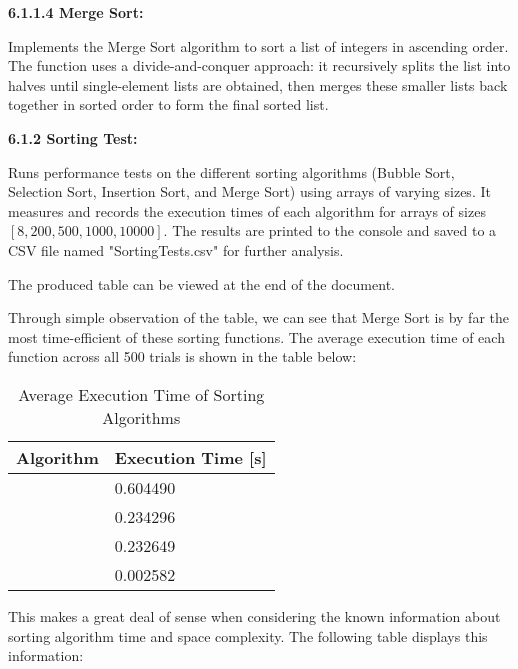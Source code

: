 \begin{homeworkProblem}

	{\Large\textbf{6.1.1.4 Merge Sort:}}

	Implements the Merge Sort algorithm to sort a list of integers in ascending order. The function uses a divide-and-conquer approach: it recursively splits the list into halves until single-element lists are obtained, then merges these smaller lists back together in sorted order to form the final sorted list.

\end{homeworkProblem}

\begin{homeworkProblem}

	{\Large\textbf{6.1.2 Sorting Test:}}

	Runs performance tests on the different sorting algorithms (Bubble Sort, Selection Sort, Insertion Sort, and Merge Sort) using arrays of varying sizes. It measures and records the execution times of each algorithm for arrays of sizes \( \left[ 8, 200, 500, 1000, 10000 \right] \). The results are printed to the console and saved to a CSV file named "SortingTests.csv" for further analysis.

	The produced table can be viewed at the end of the document.

	Through simple observation of the table, we can see that Merge Sort is by far the most time-efficient of these sorting functions. The average execution time of each function across all 500 trials is shown in the table below:
	\begin{table}[ht]
		\caption{Average Execution Time of Sorting Algorithms}\label{tab:sort_avg}
		\begin{center}
			\begin{tabular}[c]{l|l}
				\hline
				\multicolumn{1}{c|}{\textbf{Algorithm}} &
				\multicolumn{1}{c}{\textbf{Execution Time [s]}} \\
				\hline
				\text{Bubble Sort} & 0.604490 \\
				\text{Selection Sort} & 0.234296 \\
				\text{Insertion Sort} & 0.232649 \\
				\text{Merge Sort} & 0.002582
			\end{tabular}
		\end{center}
	\end{table}

	This makes a great deal of sense when considering the known information about sorting algorithm time and space complexity. The following table displays this information:


\end{homeworkProblem}
